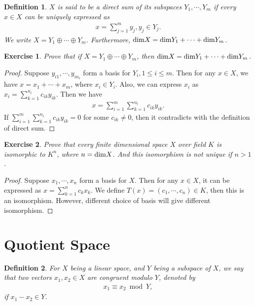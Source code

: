 \documentclass[10pt]{book}
\newtheorem{definition}{Definition}[chapter]
\newtheorem{exercise}{Exercise}[section]
\theoremstyle{definition}
\numberwithin{equation}{chapter}
\begin{document}
\medskip

\begin{definition}
$X$ is said to be a direct sum of its subspaces $Y_1, \cdots, Y_m$ if every $x\in X$ can be uniquely expressed as
\begin{align*}
    x = \sum^m_{j=1}y_j, y_j\in Y_j.
\end{align*}
We write $X = Y_1 \oplus \cdots \oplus Y_m$. Furthermore, ${\rm dim}X = {\rm dim}Y_1 +\cdots + {\rm dim}Y_m$.
\end{definition}

\medskip

\begin{exercise}
Prove that if $X = Y_1 \oplus \cdots \oplus Y_m$, then ${\rm dim}X = {\rm dim}Y_1 +\cdots + {\rm dim}Y_m$.
\end{exercise}
\begin{proof}
Suppose $y_{i1}, \cdots, y_{in_i}$ form a basis for $Y_i, 1\leq i\leq m$. Then for any $x\in X$, we have $x = x_1 +\cdots +x_m$, where $x_i\in Y_i$. Also, we can express $x_i$ as $x_i = \sum^{n_i}_{k=1}c_{i k} y_{i k}$. Then we have 
\begin{align*}
    x = \sum^m_{i=1}\sum^{n_i}_{k=1}c_{i k} y_{i k}.
\end{align*}
If $\sum^m_{i=1}\sum^{n_i}_{k=1}c_{i k} y_{i k} = 0$ for some $c_{ik}\neq 0$, then it contradicts with the definition of direct sum.
\end{proof}

\medskip

\begin{exercise}
Prove that every finite dimensional space $X$ over field $K$ is isomorphic to $K^n$, where $n = {\rm dim}X$. And this isomorphism is not unique if $n > 1$.
\end{exercise}
\begin{proof}
Suppose $x_1,\cdots, x_n$ form a basis for $X$. Then for any $x\in X$, it can be expressed as $x = \sum^n_{k=1}c_k x_k$. We define $T(x) = (c_1, \cdots, c_n)\in K$, then this is an isomorphism. However, different choice of basis will give different isomorphism.
\end{proof}

\medskip

\section{Quotient Space}
\begin{definition}
For $X$ being a linear space, and $Y$ being a subspace of $X$, we say that two vectors $x_1, x_2\in X$ are congruent modulo $Y$, denoted by
\begin{align*}
    x_1 \equiv x_2 \bmod Y,
\end{align*}
if $x_1-x_2\in Y$.
\end{definition}
\end{document}
